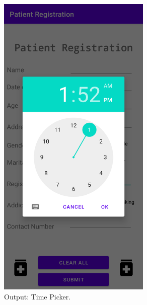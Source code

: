 \documentclass[12pt, a4]{article}
\begin{document}
\subsection*{}
\begin{figure}[h]
\centering
\caption{Output: Time Picker.}
\includegraphics[height=15cm, width=7.3cm]{PatientRegistration/Screenshots/TimePicker.png}
\end{figure}

\newpage
\end{document}
